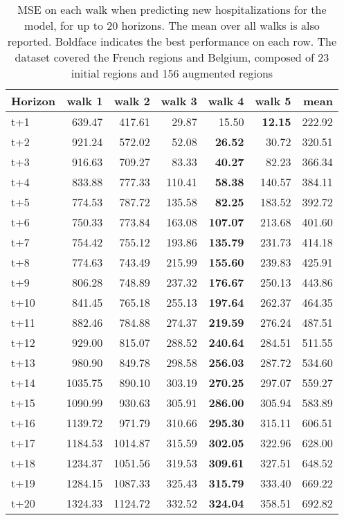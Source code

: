 \begin{table}[H]
\centering
\caption{MSE on each walk when predicting new hospitalizations for the model, for up to 20 horizons. The mean over all walks is also reported. Boldface indicates the best performance on each row. The dataset covered the French regions and Belgium, composed of 23 initial regions and 156 augmented regions }
\label{tab:MSE_walk_encoder_decoder}
\begin{tabular}{lrrrrrr}
\toprule
Horizon &  walk 1 &  walk 2 &  walk 3 &  walk 4 &  walk 5 &   mean \\
\midrule
t+1  & 639.47  & 417.61  & 29.87  & 15.50  & \textbf{12.15}  & 222.92  \\
t+2  & 921.24  & 572.02  & 52.08  & \textbf{26.52}  & 30.72  & 320.51  \\
t+3  & 916.63  & 709.27  & 83.33  & \textbf{40.27}  & 82.23  & 366.34  \\
t+4  & 833.88  & 777.33  & 110.41  & \textbf{58.38}  & 140.57  & 384.11  \\
t+5  & 774.53  & 787.72  & 135.58  & \textbf{82.25}  & 183.52  & 392.72  \\
t+6  & 750.33  & 773.84  & 163.08  & \textbf{107.07}  & 213.68  & 401.60  \\
t+7  & 754.42  & 755.12  & 193.86  & \textbf{135.79}  & 231.73  & 414.18  \\
t+8  & 774.63  & 743.49  & 215.99  & \textbf{155.60}  & 239.83  & 425.91  \\
t+9  & 806.28  & 748.89  & 237.32  & \textbf{176.67}  & 250.13  & 443.86  \\
t+10  & 841.45  & 765.18  & 255.13  & \textbf{197.64}  & 262.37  & 464.35  \\
t+11  & 882.46  & 784.88  & 274.37  & \textbf{219.59}  & 276.24  & 487.51  \\
t+12  & 929.00  & 815.07  & 288.52  & \textbf{240.64}  & 284.51  & 511.55  \\
t+13  & 980.90  & 849.78  & 298.58  & \textbf{256.03}  & 287.72  & 534.60  \\
t+14  & 1035.75  & 890.10  & 303.19  & \textbf{270.25}  & 297.07  & 559.27  \\
t+15  & 1090.99  & 930.63  & 305.91  & \textbf{286.00}  & 305.94  & 583.89  \\
t+16  & 1139.72  & 971.79  & 310.66  & \textbf{295.30}  & 315.11  & 606.51  \\
t+17  & 1184.53  & 1014.87  & 315.59  & \textbf{302.05}  & 322.96  & 628.00  \\
t+18  & 1234.37  & 1051.56  & 319.53  & \textbf{309.61}  & 327.51  & 648.52  \\
t+19  & 1284.15  & 1087.33  & 325.43  & \textbf{315.79}  & 333.40  & 669.22  \\
t+20  & 1324.33  & 1124.72  & 332.52  & \textbf{324.04}  & 358.51  & 692.82  \\

\bottomrule
\end{tabular}
\end{table}
